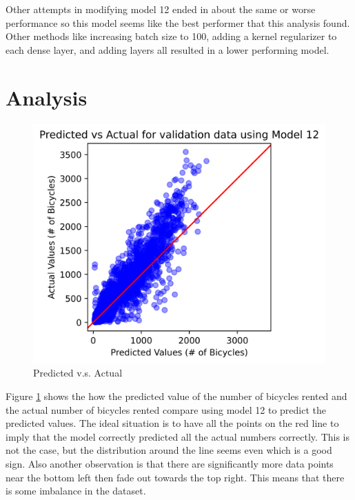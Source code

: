 \documentclass{article}
\begin{document}
    Other attempts in modifying model 12 ended in about the same or worse performance so this model seems like the best performer 
    that this analysis found. Other methods like increasing batch size to 100, adding a kernel regularizer to each dense layer, 
    and adding layers all resulted in a lower performing model.

\section{Analysis}
    \begin{figure}[H]
        \includegraphics[width=\linewidth]{images/predictactual.png}
        \caption{Predicted v.s. Actual}
        \label{fig:predictactual}
    \end{figure}
    Figure \ref{fig:predictactual} shows the how the predicted value of the number of bicycles rented and the actual number of bicycles rented compare 
    using model 12 to predict the predicted values. 
    The ideal situation is to have all the points on the red line to imply that the model correctly predicted all the actual numbers correctly.
    This is not the case, but the distribution around the line seems even which is a good sign. Also another observation is that there are 
    significantly more data points near the bottom left then fade out towards the top right. This means that there is some imbalance in the dataset.
\end{document}
